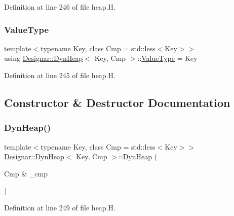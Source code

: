 Definition at line 246 of file heap.\+H.

\mbox{\label{class_designar_1_1_dyn_heap_a4c44d536a7ae76bbb7e667e1ea3b94ff}} 
\subsubsection{\texorpdfstring{Value\+Type}{ValueType}}
{\footnotesize\ttfamily template$<$typename Key, class Cmp = std\+::less$<$\+Key$>$$>$ \\
using \hyperlink{class_designar_1_1_dyn_heap}{Designar\+::\+Dyn\+Heap}$<$ Key, Cmp $>$\+::\hyperlink{class_designar_1_1_fixed_array_ac1cfeb4403a2dcbffd7ef494e5b873d0}{Value\+Type} =  Key}



Definition at line 245 of file heap.\+H.



\subsection{Constructor \& Destructor Documentation}
\mbox{\label{class_designar_1_1_dyn_heap_a156ccf78397ff8c10a3badf417043a28}} 
\subsubsection{\texorpdfstring{Dyn\+Heap()}{DynHeap()}\hspace{0.1cm}{\footnotesize\ttfamily [1/4]}}
{\footnotesize\ttfamily template$<$typename Key, class Cmp = std\+::less$<$\+Key$>$$>$ \\
\hyperlink{class_designar_1_1_dyn_heap}{Designar\+::\+Dyn\+Heap}$<$ Key, Cmp $>$\+::\hyperlink{class_designar_1_1_dyn_heap}{Dyn\+Heap} (\begin{DoxyParamCaption}\item[{Cmp \&}]{\+\_\+cmp }\end{DoxyParamCaption})\hspace{0.3cm}{\ttfamily [inline]}}



Definition at line 249 of file heap.\+H.

